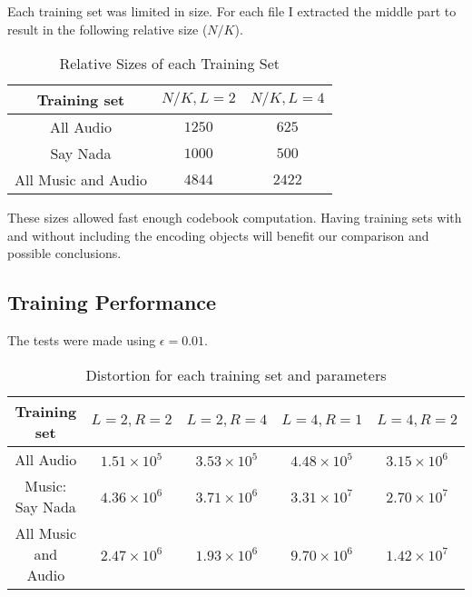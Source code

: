 \documentclass[a4paper, 11pt]{article}
\begin{document}
			Each training set was limited in size. 
			For each file I extracted the middle part to result in the following relative size ($ N/K $).
				
			\begin{table}[H]
				\centering
				\begin{tabular}{c|c|c}
					\textbf{Training set} & \textbf{$ N/K, L = 2 $} 	& \textbf{$ N/K, L = 4 $} \\ \hline
					All Audio 			& $ 1250 $ 					& $ 625 $	 			 \\ \hline
					Say Nada			& $ 1000 $ 				  	& $ 500 $ \\ \hline	
					All Music and Audio & $ 4844 $					& $	2422 $ \\
				\end{tabular}
				\caption{Relative Sizes of each Training Set}
				\label{table:TrainSets}
			\end{table}
			
			These sizes allowed fast enough codebook computation.
			Having training sets with and without including the encoding objects will benefit our comparison and possible conclusions.
				
		\subsection{Training Performance}
		
			The tests were made using $ \epsilon = 0.01 $.
			\begin{table}[H]
				\centering
				\begin{tabular}{c|c|c|c|c}
					\textbf{Training set} & \textbf{$ L=2, R=2 $} 	& \textbf{$ L=2, R=4 $}	&  \textbf{$ L=4, R=1 $}	& \textbf{$ L=4, R=2 $} \\ \hline
					All Audio 			& $ 1.51 \times 10^{5} $ 	& $ 3.53 \times 10^{5} $& $4.48 \times 10^{5} $ 	& $ 3.15 \times 10^{6} $ \\ \hline
					Music: Say Nada		& $ 4.36 \times 10^{6} $ 	& $ 3.71 \times 10^{6} $& $ 3.31 \times 10^{7} $  	& $ 2.70 \times 10^{7} $ \\ \hline
					All Music and Audio & $ 2.47 \times 10^{6} $	& $	1.93 \times 10^{6}$	& $ 9.70 \times 10^{6} $	& $	1.42 \times 10^{7} $ \\
				\end{tabular}
				\caption{Distortion for each training set and parameters}
				\label{table:TrainDist}
			\end{table}
			
\end{document}
